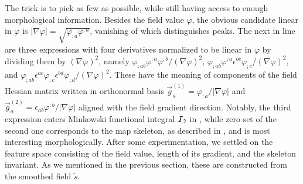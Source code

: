\documentclass{aa}
\begin{document}
The trick is to pick as few as possible, while still having access to enough morphological information. Besides the field value $\varphi$, the obvious candidate linear in $\varphi$ is $|\nabla\varphi| = \sqrt{\varphi_{;a}\varphi^{;a}}$, vanishing of which distinguishes peaks. The next in line are three expressions with four derivatives normalized to be linear in $\varphi$ by dividing them by $(\nabla\varphi)^2$, namely $\varphi_{;ab} \varphi^{;a} \varphi^{;b}/(\nabla\varphi)^2$, $\varphi_{;ab} \varphi^{;a} \epsilon^{bc}\varphi_{;c}/(\nabla\varphi)^2$, and $\varphi_{;ab} \epsilon^{ac} \varphi_{;c} \epsilon^{bd}\varphi_{;d}/(\nabla\varphi)^2$. These have the meaning of components of the field Hessian matrix written in orthonormal basis $\vec{g}^{(1)}_a = \varphi_{;a}/|\nabla\varphi|$ and $\vec{g}^{(2)}_a = \epsilon_{ab}\varphi^{;b}/|\nabla\varphi|$ aligned with the field gradient direction. Notably, the third expression enters Minkowski functional integral ${\cal I}_2$ in \cite{1998MNRAS.297..355S}, while zero set of the second one corresponds to the map skeleton, as described in \cite{2006MNRAS.366.1201N}, and is most interesting morphologically. After some experimentation, we settled on the feature space consisting of the field value, length of its gradient, and the skeleton invariant. As we mentioned in the previous section, these are constructed from the smoothed field $\tilde{s}$.
\end{document}
